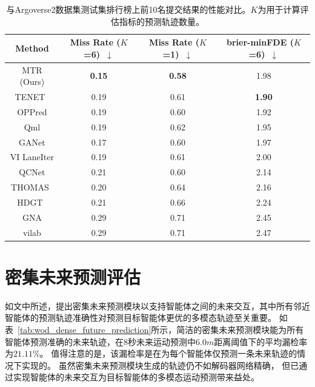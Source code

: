 \documentclass{article}
\begin{document}
    	
	\begin{table}[t]
		\centering\small
		\setlength\tabcolsep{9pt}
		\caption{与Argoverse2数据集测试集排行榜上前10名提交结果的性能对比。$K$为用于计算评估指标的预测轨迹数量。}
		\vspace{1mm}
			\begin{tabular}{c|ccc}
				\hline
				\rowcolor{mygray}Method & Miss Rate ($K$=6)~$\downarrow$ & Miss Rate ($K$=1)~$\downarrow$ & brier-minFDE ($K$=6)~$\downarrow$ \\ 
				\hline
				MTR (Ours) & {\bf 0.15} & {\bf 0.58} & 1.98 \\
		    TENET~\cite{wang2022tenet} & 0.19 & 0.61 & {\bf 1.90}\\
			    OPPred & 0.19 & 0.60 & 1.92\\
			    Qml & 0.19 & 0.62 & 1.95\\
			    GANet & 0.17 & 0.60 & 1.97\\
                VI LaneIter & 0.19 & 0.61 & 2.00\\
                QCNet & 0.21 & 0.60 & 2.14\\
                THOMAS~\cite{gilles2021thomas} & 0.20 & 0.64 & 2.16\\
                HDGT~\cite{jia2022hdgt} & 0.21 & 0.66 & 2.24 \\ 
                GNA & 0.29 & 0.71 & 2.45\\
                vilab & 0.29 & 0.71 & 2.47\\
				\hline 
		\end{tabular}
		\label{tab:argo2_test}
		\vspace{3mm}
	\end{table}
	
    

    \section{密集未来预测评估}\label{sec:dense_future_prediction}
    如文中所述，提出密集未来预测模块以支持智能体之间的未来交互，其中所有邻近智能体的预测轨迹准确性对预测目标智能体更优的多模态轨迹至关重要。
    如表~\ref{tab:wod_dense_future_prediction}所示，简洁的密集未来预测模块能为所有智能体预测准确的未来轨迹，在8秒未来运动预测中$6.0m$距离阈值下的平均漏检率为$21.11\%$。
    值得注意的是，该漏检率是在为每个智能体仅预测一条未来轨迹的情况下实现的。
    虽然密集未来预测模块生成的轨迹仍不如解码器网络精确，
    但已通过实现智能体的未来交互为目标智能体的多模态运动预测带来益处。
    	
\end{document}
